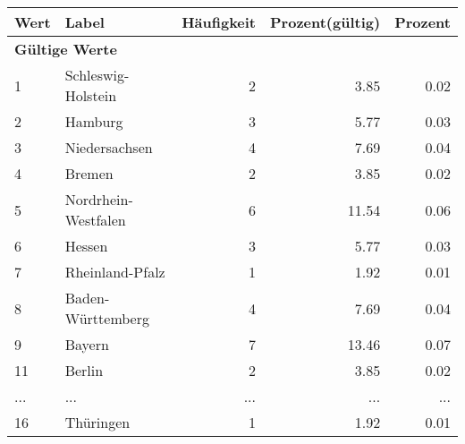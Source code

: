      \begin{longtable}{lXrrr}
     \toprule
     \textbf{Wert} & \textbf{Label} & \textbf{Häufigkeit} & \textbf{Prozent(gültig)} & \textbf{Prozent} \\
     \endhead
     \midrule
     \multicolumn{5}{l}{\textbf{Gültige Werte}}\\
        1 & \multicolumn{1}{X}{Schleswig-Holstein} & %
          \num{2} &
          \num[round-mode=places,round-precision=2]{3.85} &
          \num[round-mode=places,round-precision=2]{0.02} \\
        2 & \multicolumn{1}{X}{Hamburg} & %
          \num{3} &
          \num[round-mode=places,round-precision=2]{5.77} &
          \num[round-mode=places,round-precision=2]{0.03} \\
        3 & \multicolumn{1}{X}{Niedersachsen} & %
          \num{4} &
          \num[round-mode=places,round-precision=2]{7.69} &
          \num[round-mode=places,round-precision=2]{0.04} \\
        4 & \multicolumn{1}{X}{Bremen} & %
          \num{2} &
          \num[round-mode=places,round-precision=2]{3.85} &
          \num[round-mode=places,round-precision=2]{0.02} \\
        5 & \multicolumn{1}{X}{Nordrhein-Westfalen} & %
          \num{6} &
          \num[round-mode=places,round-precision=2]{11.54} &
          \num[round-mode=places,round-precision=2]{0.06} \\
        6 & \multicolumn{1}{X}{Hessen} & %
          \num{3} &
          \num[round-mode=places,round-precision=2]{5.77} &
          \num[round-mode=places,round-precision=2]{0.03} \\
        7 & \multicolumn{1}{X}{Rheinland-Pfalz} & %
          \num{1} &
          \num[round-mode=places,round-precision=2]{1.92} &
          \num[round-mode=places,round-precision=2]{0.01} \\
        8 & \multicolumn{1}{X}{Baden-Württemberg} & %
          \num{4} &
          \num[round-mode=places,round-precision=2]{7.69} &
          \num[round-mode=places,round-precision=2]{0.04} \\
        9 & \multicolumn{1}{X}{Bayern} & %
          \num{7} &
          \num[round-mode=places,round-precision=2]{13.46} &
          \num[round-mode=places,round-precision=2]{0.07} \\
        11 & \multicolumn{1}{X}{Berlin} & %
          \num{2} &
          \num[round-mode=places,round-precision=2]{3.85} &
          \num[round-mode=places,round-precision=2]{0.02} \\
       ... & ... & ... & ... & ... \\
        16 & \multicolumn{1}{X}{Thüringen} & %
          \num{1} &
          \num[round-mode=places,round-precision=2]{1.92} &
          \num[round-mode=places,round-precision=2]{0.01} \\


\end{longtable}
